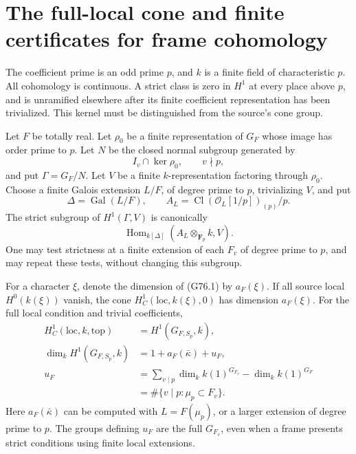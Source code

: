 \section{The full-local cone and finite certificates for frame cohomology}
\label{sec:cubic-frame-cohomology-certificate}

The coefficient prime is an odd prime \(p\), and \(k\) is a finite field of characteristic \(p\). All cohomology is continuous. A strict class is zero in \(H^1\) at every place above \(p\), and is unramified elsewhere after its finite coefficient representation has been trivialized. This kernel must be distinguished from the source's cone group.

\begin{proposition}
\label{prop:ACG76duality}
Let \(F\) be totally real. Let \(\rho_0\) be a finite representation of \(G_F\) whose image has order prime to \(p\). Let \(N\) be the closed normal subgroup generated by
\[
 I_v\cap\ker\rho_0,\qquad v\nmid p,
\]
and put \(\Gamma=G_F/N\). Let \(V\) be a finite \(k\)-representation factoring through \(\rho_0\). Choose a finite Galois extension \(L/F\), of degree prime to \(p\), trivializing \(V\), and put
\[
 \Delta=\operatorname{Gal}(L/F),\qquad
 A_L=\operatorname{Cl}(\mathcal O_L[1/p])_{(p)}/p.
\]
The strict subgroup of \(H^1(\Gamma,V)\) is canonically
\[
 \operatorname{Hom}_{k[\Delta]}(A_L\otimes_{\mathbf F_p}k,V).
 \tag{G76.1}
\]
One may test strictness at a finite extension of each \(F_v\) of degree prime to \(p\), and may repeat these tests, without changing this subgroup.

For a character \(\xi\), denote the dimension of (G76.1) by \(a_F(\xi)\). If all source local \(H^0(k(\xi))\) vanish, the cone \(H^1_C(\mathrm{loc},k(\xi),0)\) has dimension \(a_F(\xi)\). For the full local condition and trivial coefficients,
\[
 \begin{split}
 H^1_C(\mathrm{loc},k,\mathrm{top})&=H^1(G_{F,S_p},k),\\
 \dim_k H^1(G_{F,S_p},k)&=1+a_F(\bar\kappa)+u_F,\\
 u_F&=\sum_{v\mid p}\dim_k k(1)^{G_{F_v}}
       -\dim_k k(1)^{G_F}\\
    &=\#\{v\mid p:\mu_p\subset F_v\}.
 \end{split}
 \tag{G76.2}
\]
Here \(a_F(\bar\kappa)\) can be computed with \(L=F(\mu_p)\), or a larger extension of degree prime to \(p\). The groups defining \(u_F\) are the full \(G_{F_v}\), even when a frame presents strict conditions using finite local extensions.
\end{proposition}

